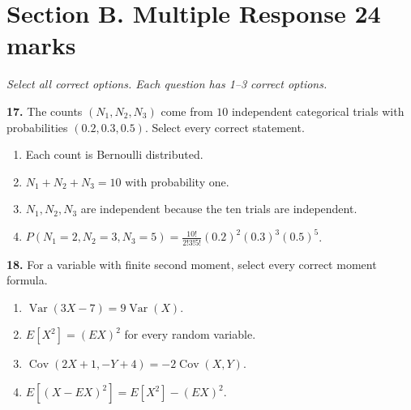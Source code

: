 \documentclass[11pt,a4paper]{article}
\begin{document}
\newpage\section*{Section B. Multiple Response \hfill 24 marks}
\textit{Select all correct options. Each question has 1--3 correct options.}\par
\par\noindent\begin{minipage}{\linewidth}
\textbf{17.} The counts \((N_1,N_2,N_3)\) come from \(10\) independent categorical trials with probabilities \((0.2,0.3,0.5)\). Select every correct statement.
\begin{enumerate}[label=(\Alph*),leftmargin=8mm,itemsep=2pt,topsep=2pt]
\item Each count is Bernoulli distributed.
\item \(N_1+N_2+N_3=10\) with probability one.
\item \(N_1,N_2,N_3\) are independent because the ten trials are independent.
\item \(P(N_1=2,N_2=3,N_3=5)=\frac{10!}{2!3!5!}(0.2)^2(0.3)^3(0.5)^5\).
\end{enumerate}

\end{minipage}\par\vspace{3mm}
\par\noindent\begin{minipage}{\linewidth}
\textbf{18.} For a variable with finite second moment, select every correct moment formula.
\begin{enumerate}[label=(\Alph*),leftmargin=8mm,itemsep=2pt,topsep=2pt]
\item \(\operatorname{Var}(3X-7)=9\operatorname{Var}(X)\).
\item \(E[X^2]=(E X)^2\) for every random variable.
\item \(\operatorname{Cov}(2X+1,-Y+4)=-2\operatorname{Cov}(X,Y)\).
\item \(E[(X-E X)^2]=E[X^2]-(E X)^2\).
\end{enumerate}

\end{minipage}\par\vspace{3mm}
\end{document}
